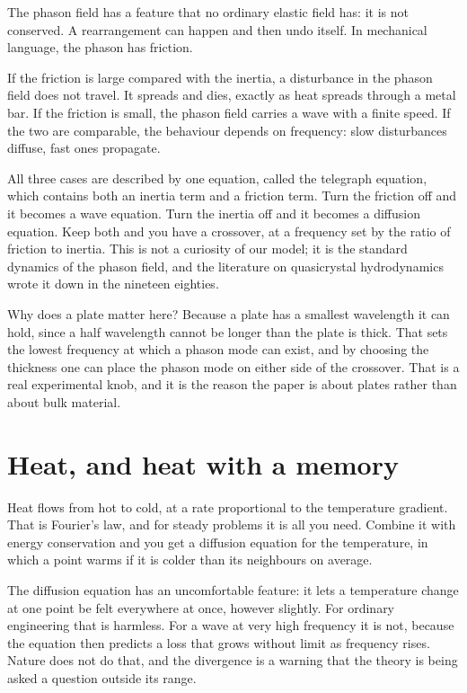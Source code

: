 \documentclass[11pt]{article}
\begin{document}
The phason field has a feature that no ordinary elastic field has: it is not conserved. A rearrangement can
happen and then undo itself. In mechanical language, the phason has friction.

If the friction is large compared with the inertia, a disturbance in the phason field does not travel. It
spreads and dies, exactly as heat spreads through a metal bar. If the friction is small, the phason field
carries a wave with a finite speed. If the two are comparable, the behaviour depends on frequency: slow
disturbances diffuse, fast ones propagate.

All three cases are described by one equation, called the telegraph equation, which contains both an inertia
term and a friction term. Turn the friction off and it becomes a wave equation. Turn the inertia off and it
becomes a diffusion equation. Keep both and you have a crossover, at a frequency set by the ratio of friction
to inertia. This is not a curiosity of our model; it is the standard dynamics of the phason field, and the
literature on quasicrystal hydrodynamics wrote it down in the nineteen eighties.

Why does a plate matter here? Because a plate has a smallest wavelength it can hold, since a half wavelength
cannot be longer than the plate is thick. That sets the lowest frequency at which a phason mode can exist, and
by choosing the thickness one can place the phason mode on either side of the crossover. That is a real
experimental knob, and it is the reason the paper is about plates rather than about bulk material.

\section{Heat, and heat with a memory}

Heat flows from hot to cold, at a rate proportional to the temperature gradient. That is Fourier's law, and
for steady problems it is all you need. Combine it with energy conservation and you get a diffusion equation
for the temperature, in which a point warms if it is colder than its neighbours on average.

The diffusion equation has an uncomfortable feature: it lets a temperature change at one point be felt
everywhere at once, however slightly. For ordinary engineering that is harmless. For a wave at very high
frequency it is not, because the equation then predicts a loss that grows without limit as frequency rises.
Nature does not do that, and the divergence is a warning that the theory is being asked a question outside
its range.
\end{document}
